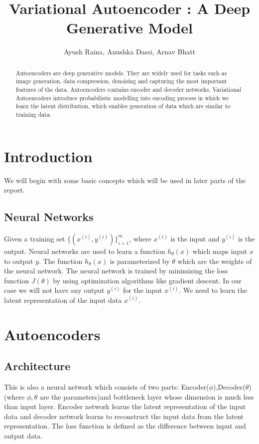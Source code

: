 \documentclass[10pt,a4paper,twoside]{tau-book}
\title{Variational Autoencoder : A Deep Generative Model}
\author{Ayush Raina, Anushka Dassi, Arnav Bhatt}
\begin{document}
\maketitle
\thispagestyle{firststyle}

\begin{abstract}
    Autoencoders are deep generative models. They are widely used for tasks such as image generation, data compression, denoising and capturing the most important features of the data. Autoencoders contains encoder and decoder networks. Variational Autoencoders introduce probabilistic modelling into encoding process in which we learn the latent distribution, which enables generation of data which are similar to training data.
\end{abstract}

\section{Introduction}
We will begin with some basic concepts which will be used in later parts of the report. 
\subsection{Neural Networks}
Given a training set $\{(x^{(i)}, y^{(i)})\}_{i=1}^{m}$, where $x^{(i)}$ is the input and $y^{(i)}$ is the output. Neural networks are used to learn a function $h_{\theta}(x)$ which maps input $x$ to output $y$. The function $h_{\theta}(x)$ is parameterized by $\theta$ which are the weights of the neural network. The neural network is trained by minimizing the loss function $J(\theta)$ by using optimization algorithms like gradient descent. In our case we will not have any output $y^{(i)}$ for the input $x^{(i)}$. We need to learn the latent representation of the input data $x^{(i)}$.

\section{Autoencoders}
\subsection{Architecture}
This is also a neural network which consists of two parts: Encoder($\phi$),Decoder($\theta$) (where $\phi, \theta$ are the parameters)and bottleneck layer whose dimension is much less than input layer. Encoder network learns the latent representation of the input data and decoder network learns to reconstruct the input data from the latent representation. The loss function is defined as the difference between input and output data.
\end{document}
